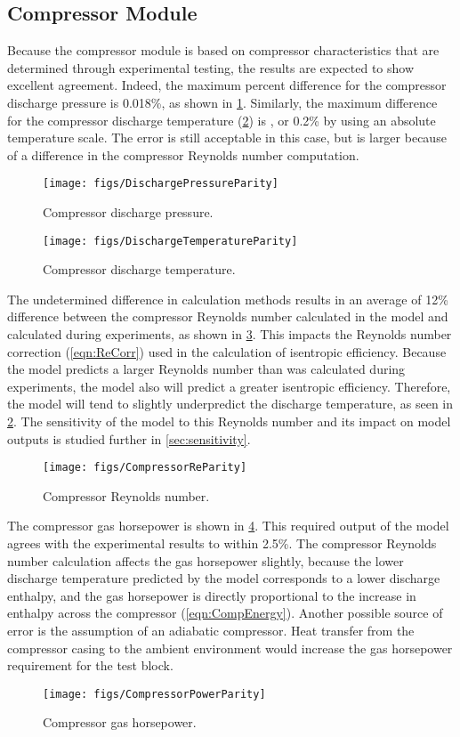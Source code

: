 \subsection{Compressor Module} \label{sec:CompResults}
Because the compressor module is based on compressor
characteristics that are determined through experimental testing, 
the results are expected to show excellent agreement.
Indeed, the maximum percent difference for the compressor discharge pressure is 0.018\%,
as shown in \cref{fig:DischargePressureParity}.
Similarly, the maximum difference for the compressor discharge temperature 
(\cref{fig:DischargeTemperatureParity}) is , or 0.2\% by using an absolute temperature scale.
The error is still acceptable in this case, but is larger because of a difference
in the compressor Reynolds number computation.
\begin{figure}[tbp]
  \centering
  \texttt{[image: figs/DischargePressureParity]}
  \caption{Compressor discharge pressure.}
  \label{fig:DischargePressureParity}
\end{figure}
\begin{figure}[tbp]
  \centering
  \texttt{[image: figs/DischargeTemperatureParity]}
  \caption{Compressor discharge temperature.}
  \label{fig:DischargeTemperatureParity}
\end{figure}

The undetermined difference in calculation methods results in an average of 12\%
difference between the compressor Reynolds number calculated in the model and calculated during experiments,
as shown in \cref{fig:CompReParity}.
This impacts the Reynolds number correction (\cref{eqn:ReCorr}) used
in the calculation of isentropic efficiency.
Because the model predicts a larger Reynolds number than was calculated during
experiments, the model also will predict a greater isentropic efficiency.
Therefore, the model will tend to slightly underpredict the
discharge temperature, as seen in \cref{fig:DischargeTemperatureParity}.
The sensitivity of the model to this Reynolds number and its impact on
model outputs is studied further in \cref{sec:sensitivity}.
\begin{figure}[tbp]
  \centering
  \texttt{[image: figs/CompressorReParity]}
  \caption{Compressor Reynolds number.}
  \label{fig:CompReParity}
\end{figure}

The compressor gas horsepower is shown in \cref{fig:PowerParity}.
This required output of the model agrees with the experimental results
to within 2.5\%.
The compressor Reynolds number calculation affects the gas horsepower slightly,
because the lower discharge temperature predicted by the model
corresponds to a lower discharge enthalpy,
and the gas horsepower is directly proportional to the increase in enthalpy
across the compressor (\cref{eqn:CompEnergy}).
Another possible source of error is the assumption of an adiabatic
compressor.
Heat transfer from the compressor casing to the ambient environment
would increase the gas horsepower requirement for the test block.
\begin{figure}[tbp]
  \centering
  \texttt{[image: figs/CompressorPowerParity]}
  \caption{Compressor gas horsepower.}
  \label{fig:PowerParity}
\end{figure}

